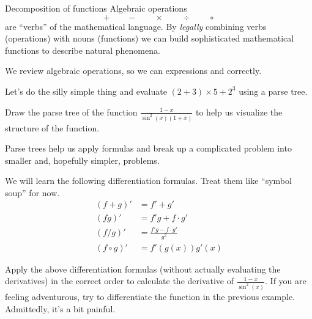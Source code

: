 \documentclass[../main.tex]{subfiles}
\begin{document}
\begin{lesson}{Decomposition of functions}
  Algebraic operations \[+ \qquad - \qquad \times \qquad \div \qquad \circ\] are ``verbs'' of the mathematical language. By \emph{legally} combining verbs (operations) with nouns (functions) we can build sophisticated mathematical functions to describe natural phenomena. 

  We review algebraic operations, so we can  expressions and  correctly.



  \begin{example}
    Let's do the silly simple thing and evaluate \((2 + 3) \times 5 + 2^{3}\) using a parse tree.
  \end{example}

  \begin{example} 
    Draw the parse tree of the function \(\frac{1 - x}{\sin^{2}(x) (1+x)}\) to help us visualize the structure of the function.
  \end{example}
  \clearpage

  Parse trees help us apply formulas  and break up a complicated problem into smaller and, hopefully simpler, problems.

  We will learn the following differentiation formulas.  Treat them like ``symbol soup'' for now. 
  \begin{align*}
    (f+g)' &= f' + g' \\
    (fg)' &= f'g + f \cdot g' \\
    (f/g)' &= \frac{f'g - f \cdot g'}{g^{2}} \\
    (f \circ g)' &= f'(g(x)) g'(x)
  \end{align*}

  \begin{example}
    Apply the above differentiation formulas (without actually evaluating the derivatives) in the correct order to calculate the derivative of \(\frac{1-x}{\sin^{2}(x)}\).  \newline
    {\scriptsize If you are feeling adventurous, try to differentiate the function in the previous example. Admittedly, it's a bit painful.}
  \end{example}

\end{lesson}
\end{document}
